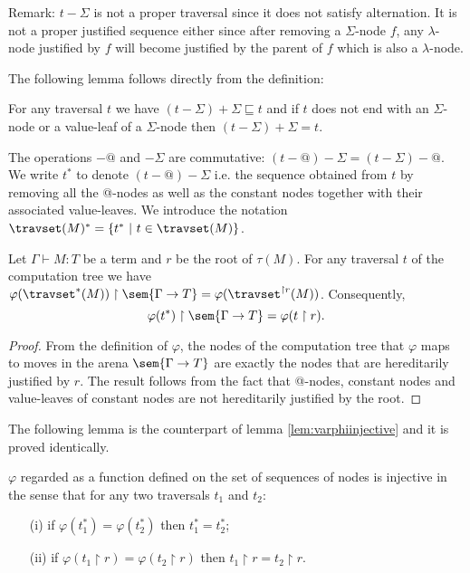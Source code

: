 Remark: $t-\Sigma$ is not a proper traversal since it does not satisfy alternation.
It is not a proper justified sequence either
since after removing a $\Sigma$-node $f$, any $\lambda$-node justified by $f$ will become
justified by the parent of $f$ which is also a $\lambda$-node.

The following lemma follows directly from the definition:
\begin{lem}
\label{lem:minus_sig_plus_sig}
For any traversal $t$ we have $(t-\Sigma)+\Sigma \sqsubseteq t$ and if $t$ does not end with an $\Sigma$-node
or a value-leaf of a $\Sigma$-node then
$(t-\Sigma)+\Sigma = t$.
\end{lem}

The operations $-@$ and $-\Sigma$ are commutative: $(t-@)-\Sigma = (t-\Sigma)-@$.
We write $t^*$ to denote $(t-@)-\Sigma$ i.e. the sequence obtained
from $t$ by removing all the @-nodes as well as the constant nodes together with
their associated value-leaves.
We introduce the notation $\travset(M)^{*} = \{ t^* \ | \  t \in \travset(M) \}$.

\begin{lem}
\label{lem:SIGMACONST:varphi_filter}
Let $\Gamma \vdash M :T$ be a term and $r$ be the root of $\tau(M)$.
For any traversal $t$ of the computation tree we have
$ \varphi(\travset^*(M)) \upharpoonright \sem{\Gamma \rightarrow T} = \varphi(\travset^{\upharpoonright r}(M)) $.
 Consequently,
$$\varphi(t^*) \upharpoonright \sem{\Gamma \rightarrow T} = \varphi(t\upharpoonright r).$$
\end{lem}
\begin{proof}
    From the definition of $\varphi$, the nodes of the computation tree that $\varphi$ maps
    to moves in the arena $\sem{\Gamma \rightarrow T}$ are exactly the nodes that are hereditarily justified by $r$.
    The result follows from the fact that @-nodes, constant nodes and value-leaves of constant nodes
    are not hereditarily justified by the root.
\end{proof}

The following lemma is the counterpart of lemma \ref{lem:varphiinjective} and it is proved
identically.
\begin{lem}
\label{lem:SIGMACONST:varphiinjective}
$\varphi$ regarded as a function defined on the set of
sequences of nodes is injective in the sense that for any two traversals $t_1$ and $t_2$:
\begin{itemize}
\item[(i)] if $\varphi (t_1^* ) = \varphi (t_2^* )$ then $t_1^* =t_2^*$;
\item[(ii)] if $\varphi (t_1 \upharpoonright r ) = \varphi (t_2 \upharpoonright r )$ then $t_1\upharpoonright r = t_2\upharpoonright r$.
\end{itemize}
\end{lem}

